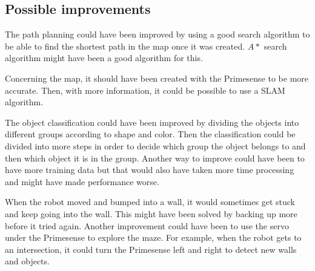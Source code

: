\subsection{Possible improvements}
The path planning could have been improved by using a good search algorithm to be able to find the shortest path in the map once it was created. $A\ast$ search algorithm might have been a good algorithm for this.

\bigskip
\noindent Concerning the map, it should have been created with the Primesense to be more accurate. Then, with more information, it could be possible to use a SLAM algorithm.

\bigskip
\noindent The object classification could have been improved by dividing the objects into different groups according to shape and color. Then the classification could be divided into more steps in order to decide which group the object belongs to and then which object it is in the group. Another way to improve could have been to have more training data but that would also have taken more time processing and might have made performance worse. 

\bigskip
\noindent When the robot moved and bumped into a wall, it would sometimes get stuck and keep going into the wall. This might have been solved by backing up more before it tried again. Another improvement could have been to use the servo under the Primesense to explore the maze. For example, when the robot gets to an intersection, it could turn the Primesense left and right to detect new walls and objects.
 
 